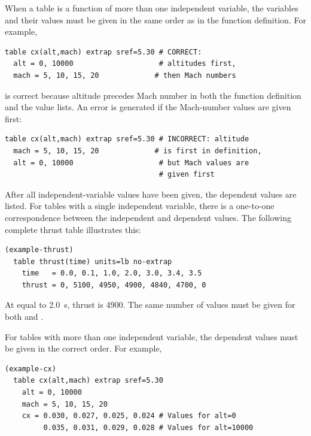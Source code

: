 When a table is a function of more than one independent variable, the variables and
their values must be given in the same order as in the function definition. For
example,

\begin{lstlisting}[style=taosmanual]
table cx(alt,mach) extrap sref=5.30 # CORRECT:
  alt = 0, 10000                    # altitudes first,
  mach = 5, 10, 15, 20             # then Mach numbers
\end{lstlisting}

is correct because altitude precedes Mach number in both the function definition and
the value lists. An error is generated if the Mach-number values are given first:

\begin{lstlisting}[style=taosmanual]
table cx(alt,mach) extrap sref=5.30 # INCORRECT: altitude
  mach = 5, 10, 15, 20             # is first in definition,
  alt = 0, 10000                    # but Mach values are
                                    # given first
\end{lstlisting}


After all independent-variable values have been given, the dependent values are
listed. For tables with a single independent variable, there is a one-to-one
correspondence between the independent and dependent values. The following
complete thrust table illustrates this:

\begin{lstlisting}[style=taosmanual]
(example-thrust)
  table thrust(time) units=lb no-extrap
    time   = 0.0, 0.1, 1.0, 2.0, 3.0, 3.4, 3.5
    thrust = 0, 5100, 4950, 4900, 4840, 4700, 0
\end{lstlisting}

At  equal to \SI{2.0}{\second}, thrust is \SI{4900}{\poundforce}. The
same number of values must be given for both  and
.

For tables with more than one independent variable, the dependent values must be
given in the correct order. For example,

\begin{lstlisting}[style=taosmanual]
(example-cx)
  table cx(alt,mach) extrap sref=5.30
    alt = 0, 10000
    mach = 5, 10, 15, 20
    cx = 0.030, 0.027, 0.025, 0.024 # Values for alt=0
         0.035, 0.031, 0.029, 0.028 # Values for alt=10000
\end{lstlisting}

